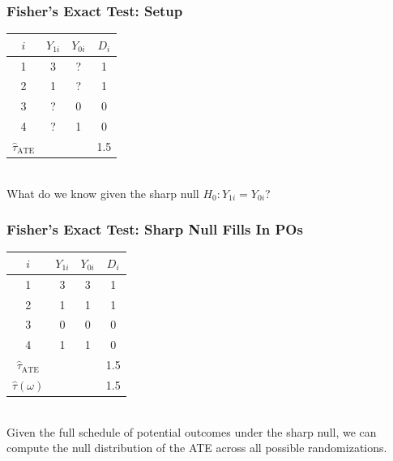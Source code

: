 \documentclass[xcolor=dvipsnames]{beamer}
\begin{document}
\begin{frame}
\frametitle{Fisher's Exact Test: Setup}
\smallskip
\begin{tabular}{@{} c c c c @{}}
\toprule
$i$ & $Y_{1i}$ & $Y_{0i}$ & $D_i$ \\
\midrule
\rowcolor{blue!8}  1 & 3 & \textcolor{red!70!black}{?} & 1 \\
\rowcolor{blue!8}  2 & 1 & \textcolor{red!70!black}{?} & 1 \\
                    3 & \textcolor{red!70!black}{?} & 0 & 0 \\
                    4 & \textcolor{red!70!black}{?} & 1 & 0 \\
\midrule
$\widehat{\tau}_{\text{ATE}}$ & & & 1.5 \\
\bottomrule
\end{tabular}
\bigskip\\
What do we know given the sharp null $H_0: Y_{1i} = Y_{0i}$?
\end{frame}

\begin{frame}
\frametitle{Fisher's Exact Test: Sharp Null Fills In POs}
\smallskip
\begin{tabular}{@{} c c c c @{}}
\toprule
$i$ & $Y_{1i}$ & $Y_{0i}$ & $D_i$ \\
\midrule
\rowcolor{blue!8}  1 & 3 & \textcolor{red!70!black}{3} & 1 \\
\rowcolor{blue!8}  2 & 1 & \textcolor{red!70!black}{1} & 1 \\
                    3 & \textcolor{red!70!black}{0} & 0 & 0 \\
                    4 & \textcolor{red!70!black}{1} & 1 & 0 \\
\midrule
$\widehat{\tau}_{\text{ATE}}$ & & & 1.5 \\
$\hat\tau(\omega)$ & & & 1.5 \\
\bottomrule
\end{tabular}
\bigskip\\
\small
Given the full schedule of potential outcomes under the sharp null, we can compute the null distribution of the ATE across all possible randomizations.
\end{frame}
\end{document}
